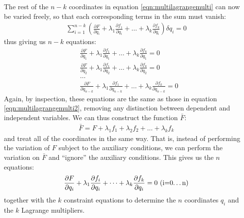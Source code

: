 The rest of the $n-k$ coordinates in equation \ref{eqn:multilagrangemulti} can now be varied freely, so that each corresponding terms in the sum must vanish:
\begin{align}
\sum_{i=1}^{n-k}\left(\frac{\partial F}{\partial q_i}+\lambda_1 \frac{\partial f_1}{\partial q_i}+\dots +\lambda_k \frac{\partial f_k}{\partial q_i}\right)\delta q_i=0
\end{align}
thus giving us $n-k$ equations:
\begin{align}
&\frac{\partial F}{\partial q_1}+\lambda_1 \frac{\partial f_1}{\partial q_1}+\dots +\lambda_k \frac{\partial f_k}{\partial q_1}=0\nonumber\\
&\frac{\partial F}{\partial q_2}+\lambda_1 \frac{\partial f_1}{\partial q_2}+\dots +\lambda_k \frac{\partial f_k}{\partial q_2}=0\nonumber\\
&\dots \nonumber\\
&\frac{\partial F}{\partial q_{n-k}}+\lambda_1 \frac{\partial f_1}{\partial q_{n-k}}+\dots +\lambda_k \frac{\partial f_k}{\partial q_{n-k}}=0
\end{align}
Again, by inspection, these equations are the same as those in equation \ref{eqn:multilagrangemulti2}, removing any distinction between dependent and independent variables. We can thus construct the function $\bar{F}$:
\begin{align}
\bar{F}=F+\lambda_1 f_1+\lambda_2 f_2 +\dots +\lambda_k f_k
\end{align}
and treat all of the coordinates in the same way. That is, instead of performing the variation of $F$ subject to the auxiliary conditions, we can perform the variation on $\bar{F}$ and ``ignore'' the auxiliary conditions. This gives us the $n$ equations:
\begin{align}
\frac{\partial F}{\partial q_i}+\lambda_1 \frac{\partial f_i}{\partial q_i}+\dots +\lambda_k \frac{\partial f_k}{\partial q_i}=0 \text{        (i=0\dots n)}
\end{align}
together with the $k$ constraint equations to determine the $n$ coordinates $q_i$ and the $k$ Lagrange multipliers.
